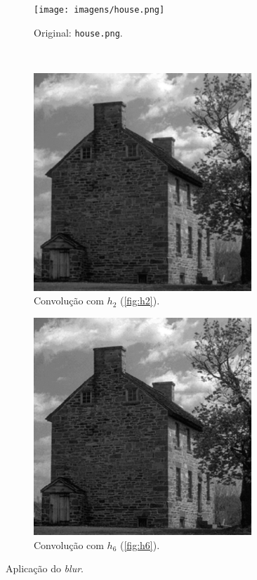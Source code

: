 \begin{figure}[H]
    \centering
    \begin{subfigure}{0.48\textwidth}
        \centering
        \texttt{[image: imagens/house.png]}
        \caption{Original: \texttt{house.png}.}
    \end{subfigure}\\[8pt]
    \begin{subfigure}{0.48\textwidth}
        \centering
        \includegraphics[width=0.9\textwidth]{resultados/house_h2.png}
        \caption{Convolução com $h_2$ (\ref{fig:h2}).}
    \end{subfigure}%
    \begin{subfigure}{0.48\textwidth}
        \centering
        \includegraphics[width=0.9\textwidth]{resultados/house_h6.png}
        \caption{Convolução com $h_6$ (\ref{fig:h6}).}
    \end{subfigure}

    \caption{Aplicação do \textit{blur}.}
    \label{fig:blur}
\end{figure}
